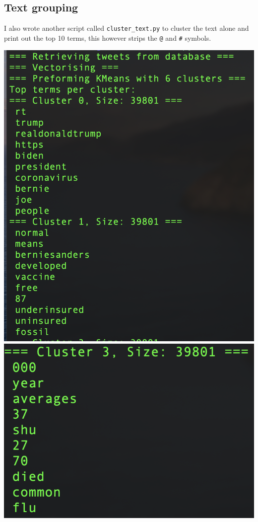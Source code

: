 \documentclass[10pt,a4paper]{article}
\begin{document}
	\subsection*{Text grouping}
	
	I also wrote another script called \verb|cluster_text.py| to cluster the text alone and print out the top 10 terms, this however strips the \verb|@| and \verb|#| symbols.

\includegraphics[scale=0.35]{images/words_cluster.png} 
\includegraphics[scale=0.35]{images/virus_cluster.png} 
\end{document}
